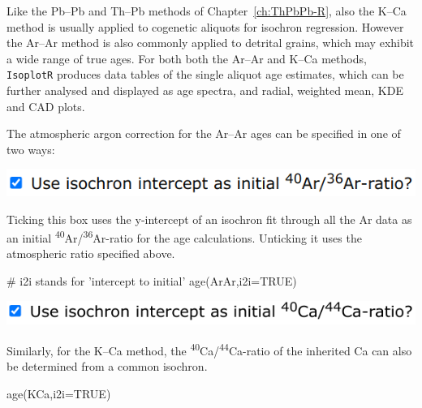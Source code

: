 \begin{refsection}
Like the Pb--Pb and Th--Pb methods of Chapter~\ref{ch:ThPbPb-R}, also
the K--Ca method is usually applied to cogenetic aliquots for isochron
regression. However the Ar--Ar method is also commonly applied to
detrital grains, which may exhibit a wide range of true ages.  For
both both the Ar--Ar and K--Ca methods, \texttt{IsoplotR} produces
data tables of the single aliquot age estimates, which can be further
analysed and displayed as age spectra, and radial, weighted mean, KDE
and CAD plots.

The atmospheric argon correction for the Ar--Ar ages can be specified
in one of two ways:\\

\noindent\begin{minipage}[t]{.5\linewidth}
\strut\vspace*{-\baselineskip}\newline
\includegraphics[width=\linewidth]{../figures/ArAri2i.png}
\end{minipage}
\begin{minipage}[t]{.5\linewidth}
Ticking this box uses the y-intercept of an isochron fit through all
the Ar data as an initial
\textsuperscript{40}Ar/\textsuperscript{36}Ar-ratio for the age
calculations. Unticking it uses the atmospheric ratio specified above.
\end{minipage}

\begin{script}
# i2i stands for 'intercept to initial'
age(ArAr,i2i=TRUE) 
\end{script}

\noindent\begin{minipage}[t]{.5\linewidth}
\strut\vspace*{-\baselineskip}\newline
\includegraphics[width=\linewidth]{../figures/KCai2i.png}
\end{minipage}
\begin{minipage}[t]{.5\linewidth}
Similarly, for the K--Ca method, the
\textsuperscript{40}Ca/\textsuperscript{44}Ca-ratio of the inherited
Ca can also be determined from a common isochron.
\end{minipage}

\begin{console}
age(KCa,i2i=TRUE)
\end{console}


\end{refsection}
